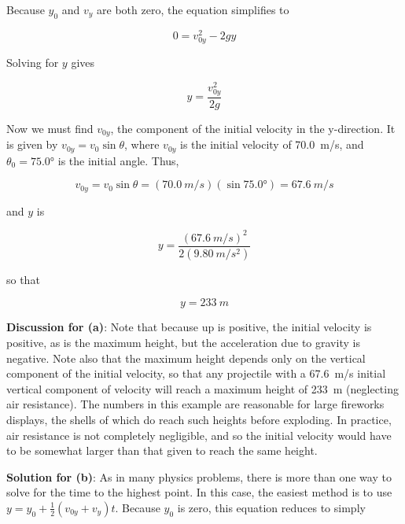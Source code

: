 \documentclass[../../main-ap-physics.tex]{subfiles}
\begin{document}
Because $y_0$ and $v_y$ are both zero, the equation simplifies to

\begin{equation*}
    0 = v_{0y}^2 - 2gy
\end{equation*}

Solving for $y$ gives

\begin{equation*}
    y = \frac{v_{0y}^2}{2g}
\end{equation*}

Now we must find $v_{0y}$, the component of the initial velocity in the y-direction. It is given by $v_{0y} = v_0 \sin{\theta}$, where $v_{0y}$ is the initial velocity of \SI{70.0}{m/s}, and $\theta_0 = \ang{75.0}$ is the initial angle. Thus,

\begin{equation*}
    v_{0y} = v_0 \sin{\theta} = \left(\SI{70.0}{m/s}\right) \left(\sin{\ang{75.0}}\right) = \SI{67.6}{m/s}
\end{equation*}

and $y$ is

\begin{equation*}
    y = \frac{\left(\SI{67.6}{m/s}\right)^2}{2\left(\SI{9.80}{m/s^2}\right)}
\end{equation*}

so that

\begin{equation*}
    y = \SI{233}{m}
\end{equation*}

\textbf{Discussion for (a)}: Note that because up is positive, the initial velocity is positive, as is the maximum height, but the acceleration due to gravity is negative. Note also that the maximum height depends only on the vertical component of the initial velocity, so that any projectile with a \SI{67.6}{m/s} initial vertical component of velocity will reach a maximum height of \SI{233}{m} (neglecting air resistance). The numbers in this example are reasonable for large fireworks displays, the shells of which do reach such heights before exploding. In practice, air resistance is not completely negligible, and so the initial velocity would have to be somewhat larger than that given to reach the same height.

\vspace{1em}

\textbf{Solution for (b)}: As in many physics problems, there is more than one way to solve for the time to the highest point. In this case, the easiest method is to use $y = y_0 + \frac{1}{2}\left(v_{0y} + v_y\right)t$. Because $y_0$ is zero, this equation reduces to simply
\end{document}
